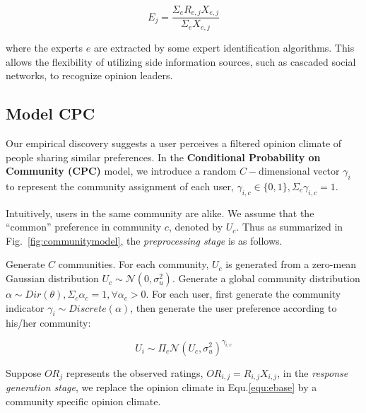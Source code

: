 \documentclass[sigconf]{acmart}
\begin{document}
\begin{equation}\label{eexpert}
E_j = \frac{\Sigma_e R_{e,j}X_{e,j}}{\Sigma_e X_{e,j}}
\end{equation}

where the experts $e$ are extracted by some expert identification algorithms. This allows the flexibility of utilizing side information sources, such as cascaded social networks, to recognize opinion leaders. 

\subsection{Model CPC}
Our empirical discovery suggests a user perceives a filtered opinion climate of people sharing similar preferences. In the \textbf{Conditional Probability on Community (CPC)} model, we introduce a random $C-$dimensional vector $\gamma_i$ to represent the community assignment of each user,  $\gamma_{i,c}\in \{0,1\}, \Sigma_c \gamma_{i,c}=1$.  


Intuitively, users in the same community are alike. We assume that the ``common'' preference in community $c$, denoted by $U_c$. Thus as summarized in Fig.~\ref{fig:communitymodel}, the \textit{preprocessing stage} is as follows.

Generate $C$ communities. For each community, $U_c$ is generated from a zero-mean Gaussian distribution $U_c \sim \mathcal{N}(0,\sigma_u^2)$. Generate a global community distribution $\alpha\sim Dir(\theta), \Sigma_c \alpha_c=1, \forall \alpha_c>0$. For each user, first generate the community indicator $\gamma_i \sim Discrete(\alpha)$, then generate the user preference according to his/her community:

\begin{equation}\label{equ:preferencebase}
U_i \sim \Pi_c \mathcal{N}(U_c,\sigma_u^2)^{\gamma_{i,c}}
\end{equation}

Suppose $OR_j$ represents the observed ratings, $OR_{i,j}=R_{i,j}X_{i,j}$, in the \textit{response generation stage}, we replace the opinion climate in Equ.\ref{equ:ebase} by a community specific opinion climate.  
\end{document}
